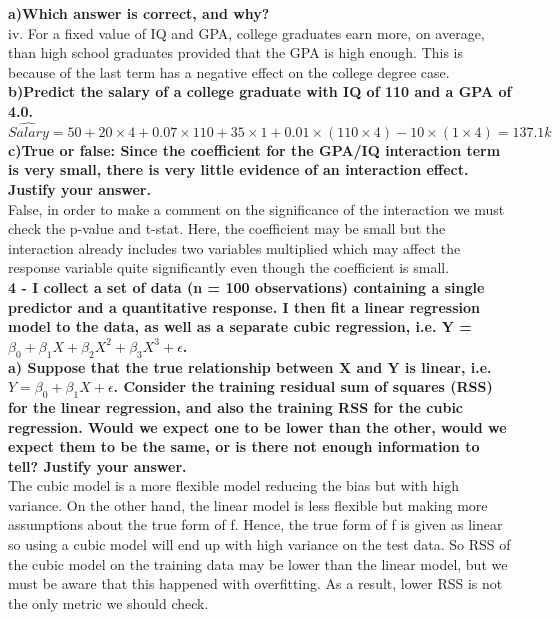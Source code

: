 \documentclass{article}
\begin{document}
\textbf{a)Which answer is correct, and why?}\\

iv. For a fixed value of IQ and GPA, college graduates earn
more, on average, than high school graduates provided that
the GPA is high enough. This is because of the last term has a negative effect on the college degree case.
\textbf{b)Predict the salary of a college graduate with IQ of 110 and a
GPA of 4.0.}\\

$\hat{Salary} = 50 + 20 \times 4 + 0.07 \times 110 + 35 \times 1 + 0.01 \times(110\times4) - 10 \times (1\times4) = 137.1k$\\

\textbf{c)True or false: Since the coefficient for the GPA/IQ interaction
term is very small, there is very little evidence of an interaction
effect. Justify your answer.}\\

False, in order to make a comment on the significance of the interaction we must check the p-value and t-stat. Here, the coefficient may be small but the interaction already includes two variables multiplied which may affect the response variable quite significantly even though the coefficient is small.\\

\textbf{4 - I collect a set of data (n = 100 observations) containing a single
predictor and a quantitative response. I then fit a linear regression
model to the data, as well as a separate cubic regression, i.e. Y =
$\beta_0 + \beta_1X + \beta_2X^2 + \beta_3X^3 + \epsilon$.}\\

\textbf{a) Suppose that the true relationship between X and Y is linear,
i.e. $Y = \beta_0 + \beta_1X + \epsilon$. Consider the training residual sum of
squares (RSS) for the linear regression, and also the training
RSS for the cubic regression. Would we expect one to be lower
than the other, would we expect them to be the same, or is there
not enough information to tell? Justify your answer.}\\

The cubic model is a more flexible model reducing the bias but with high variance. On the other hand, the linear model is less flexible but making more assumptions about the true form of f. Hence, the true form of f is given as linear so using a cubic model will end up with high variance on the test data. So RSS of the cubic model on the training data may be lower than the linear model, but we must be aware that this happened with overfitting. As a result, lower RSS is not the only metric we should check.\\
\end{document}
